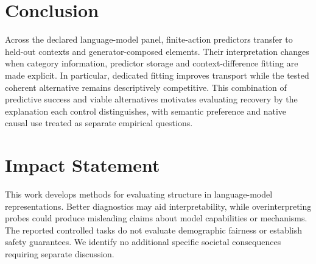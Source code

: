 \documentclass{article}
\begin{document}
\section{Conclusion}
Across the declared language-model panel, finite-action predictors transfer to held-out contexts and generator-composed elements. Their interpretation changes when category information, predictor storage and context-difference fitting are made explicit. In particular, dedicated fitting improves transport while the tested coherent alternative remains descriptively competitive. This combination of predictive success and viable alternatives motivates evaluating recovery by the explanation each control distinguishes, with semantic preference and native causal use treated as separate empirical questions.

\FloatBarrier
\label{sec:main-end}

\section*{Impact Statement}
This work develops methods for evaluating structure in language-model representations. Better diagnostics may aid interpretability, while overinterpreting probes could produce misleading claims about model capabilities or mechanisms. The reported controlled tasks do not evaluate demographic fairness or establish safety guarantees. We identify no additional specific societal consequences requiring separate discussion.



\appendix
\onecolumn








\end{document}

